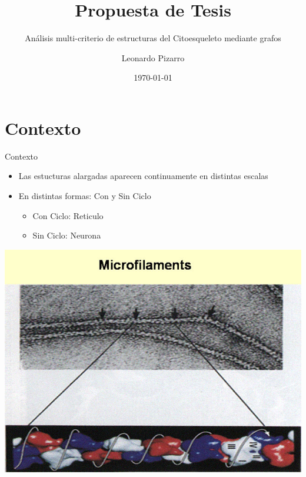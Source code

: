 \documentclass[10pt]{beamer}
\title{Propuesta de Tesis}
\subtitle{Análisis multi-criterio de estructuras del Citoesqueleto mediante grafos}
\date{\today}
\author{Leonardo Pizarro}
\institute{Trabajo de Tesis I - Primavera 2018}
\begin{document}
\maketitle


\section{Contexto}

\begin{frame}[fragile]{Contexto}
\begin{itemize}
    \item Las estucturas alargadas aparecen continuamente en distintas escalas
    \item En distintas formas: Con y Sin Ciclo
    \begin{itemize}
        \item Con Ciclo: Reticulo
        \item Sin Ciclo: Neurona
    \end{itemize}
\end{itemize}
\begin{center}
    \includegraphics[width=\textwidth,height=0.5\textheight]{nr120.jpg}
        \end{center}
\end{frame}
\end{document}
